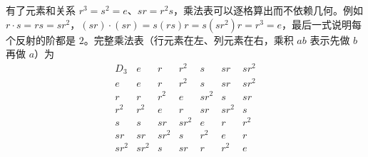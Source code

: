 有了元素和关系 $r^3=s^2=e$、$sr=r^2s$，乘法表可以逐格算出而不依赖几何。例如 $r\cdot s=rs=sr^2$，$(sr)\cdot(sr)=s(rs)r=s(sr^2)r=r^3=e$，最后一式说明每个反射的阶都是 $2$。完整乘法表（行元素在左、列元素在右，乘积 $ab$ 表示先做 $b$ 再做 $a$）为
\begin{equation}
\begin{array}{c|cccccc}
D_3 & e & r & r^2 & s & sr & sr^2 \\ \hline
e     & e & r & r^2 & s & sr & sr^2 \\
r     & r & r^2 & e & sr^2 & s & sr \\
r^2   & r^2 & e & r & sr & sr^2 & s \\
s     & s & sr & sr^2 & e & r & r^2 \\
sr    & sr & sr^2 & s & r^2 & e & r \\
sr^2  & sr^2 & s & sr & r & r^2 & e
\end{array}
\label{eq:d3-multiplication-table}
\end{equation}

